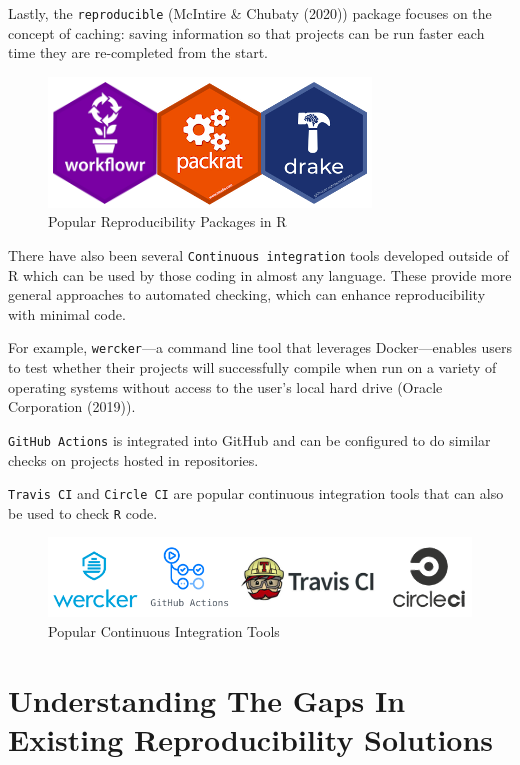\documentclass[12pt,twoside]{reedthesis}
\begin{document}
Lastly, the \texttt{reproducible} (McIntire \& Chubaty (2020)) package focuses on the concept of caching: saving information so that projects can be run faster each time they are re-completed from the start.
\begin{figure}

{\centering \includegraphics[width=0.5\linewidth]{figure/packages} 

}

\caption{Popular Reproducibility Packages in R}\label{fig:unnamed-chunk-5}
\end{figure}
There have also been several \texttt{Continuous\ integration} tools developed outside of R which can be used by those coding in almost any language. These provide more general approaches to automated checking, which can enhance reproducibility with minimal code.

For example, \texttt{wercker}---a command line tool that leverages Docker---enables users to test whether their projects will successfully compile when run on a variety of operating systems without access to the user's local hard drive (Oracle Corporation (2019)).

\texttt{GitHub\ Actions} is integrated into GitHub and can be configured to do similar checks on projects hosted in repositories.

\texttt{Travis\ CI} and \texttt{Circle\ CI} are popular continuous integration tools that can also be used to check \texttt{R} code.
\begin{figure}

{\centering \includegraphics[width=0.8\linewidth]{figure/ci-tools} 

}

\caption{Popular Continuous Integration Tools}\label{fig:unnamed-chunk-6}
\end{figure}
\hypertarget{understanding-the-gaps-in-existing-reproducibility-solutions}{%
\section{Understanding The Gaps In Existing Reproducibility Solutions}\label{understanding-the-gaps-in-existing-reproducibility-solutions}}
\end{document}
